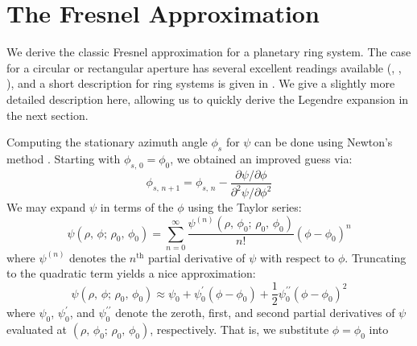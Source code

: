 \documentclass{article}
\theoremstyle{plain}
\begin{document}
    \section{The Fresnel Approximation}
        We derive the classic Fresnel approximation for a planetary ring system.
        The case for a circular or rectangular aperture has several excellent
        readings available
        (\cite[Ch.~10]{HechtOptics},
        \cite[Ch.~8]{BornAndWolfOptics},
        \cite[Ch.~4]{Goodman1969IntroductionTF}), and a short description for
        ring systems is given in \cite[p.~125,\,161]{MTR86}.
        We give a slightly more detailed description here, allowing us to
        quickly derive the Legendre expansion in the next section.
        \par\hfill\par
        Computing the stationary azimuth angle $\phi_{s}$ for $\psi$ can be
        done using Newton's method
        \cite[Ch.~11]{NearingMathematicalToolsForPhysics}. Starting with
        $\phi_{s,\,0}=\phi_{0}$, we obtained an improved guess via:
        \begin{equation}
            \phi_{s,\,n+1}=\phi_{s,\,n}-
            \frac{\partial\psi/\partial\phi}
                 {\partial^{2}\psi/\partial\phi^{2}}
        \end{equation}
        We may expand $\psi$ in terms of the $\phi$ using the Taylor
        series:
        \begin{equation}
            \psi(\rho,\,\phi;\,\rho_{0},\,\phi_{0})
            =\sum_{n=0}^{\infty}
                \frac{\psi^{(n)}(\rho,\,\phi_{0};\,\rho_{0},\,\phi_{0})}{n!}
                (\phi-\phi_{0})^{n}
        \end{equation}
        where $\psi^{(n)}$ denotes the $n^{\textrm{th}}$ partial derivative of
        $\psi$ with respect to $\phi$. Truncating to the quadratic term yields
        a nice approximation:
        \begin{equation}
            \label{eqn:quadratic_taylor}
            \psi(\rho,\,\phi;\,\rho_{0},\,\phi_{0})
            \approx
            \psi_{0}+\psi^{\prime}_{0}(\phi-\phi_{0})
            +\frac{1}{2}\psi^{\prime\prime}_{0}(\phi-\phi_{0})^{2}
        \end{equation}
        where $\psi_{0}$, $\psi^{\prime}_{0}$, and $\psi^{\prime\prime}_{0}$
        denote the zeroth, first, and second partial derivatives of $\psi$
        evaluated at $(\rho,\,\phi_{0};\,\rho_{0},\,\phi_{0})$, respectively.
        That is, we substitute $\phi=\phi_{0}$ into
\end{document}
